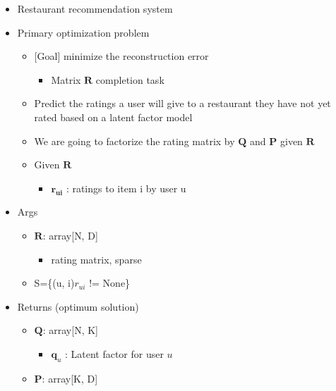 \documentclass[11pt]{article}
\providecommand{\tightlist}{%
      \setlength{\itemsep}{0pt}\setlength{\parskip}{0pt}}
\begin{document}
\begin{itemize}
\tightlist
\item
  Restaurant recommendation system
\item
  Primary optimization problem

  \begin{itemize}
  \tightlist
  \item
    {[}Goal{]} minimize the reconstruction error

    \begin{itemize}
    \tightlist
    \item
      Matrix \(\mathbf{R}\) completion task
    \end{itemize}
  \item
    Predict the ratings a user will give to a restaurant they have not
    yet rated based on a latent factor model
  \item
    We are going to factorize the rating matrix by \(\mathbf{Q}\) and
    \(\mathbf{P}\) given \(\mathbf{R}\)
  \item
    Given \(\mathbf{R}\)

    \begin{itemize}
    \tightlist
    \item
      \(\mathbf{r_{ui}}\) : ratings to item i by user u
    \end{itemize}
  \end{itemize}
\item
  Args

  \begin{itemize}
  \tightlist
  \item
    \(\mathbf{R}\): array{[}N, D{]}

    \begin{itemize}
    \tightlist
    \item
      rating matrix, sparse
    \end{itemize}
  \item
    S=\{(u, i)\textbar{}\(r_{ui}\) != None\}
  \end{itemize}
\item
  Returns (optimum solution)

  \begin{itemize}
  \tightlist
  \item
    \(\mathbf{Q}\): array{[}N, K{]}

    \begin{itemize}
    \tightlist
    \item
      \(\mathbf{q}_u\) : Latent factor for user \(u\)
    \end{itemize}
  \item
    \(\mathbf{P}\): array{[}K, D{]}


\end{itemize}
\end{itemize}
\end{document}
